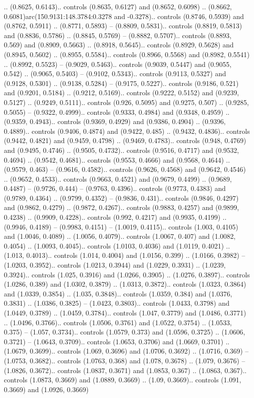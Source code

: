 .. (0.8625, 0.6143).. controls (0.8635, 0.6127) and (0.8652, 0.6098) .. (0.8662, 0.6081)arc(150.9131:148.3784:0.3278 and -0.3278).. controls (0.8746, 0.5939) and (0.8762, 0.5911) .. (0.8771, 0.5893) -- (0.8809, 0.5831).. controls (0.8819, 0.5813) and (0.8836, 0.5786) .. (0.8845, 0.5769) -- (0.8882, 0.5707).. controls (0.8893, 0.569) and (0.8909, 0.5663) .. (0.8918, 0.5645).. controls (0.8929, 0.5628) and (0.8945, 0.5602) .. (0.8955, 0.5584).. controls (0.8966, 0.5568) and (0.8982, 0.5541) .. (0.8992, 0.5523) -- (0.9029, 0.5463).. controls (0.9039, 0.5447) and (0.9055, 0.542) .. (0.9065, 0.5403) -- (0.9102, 0.5343).. controls (0.9113, 0.5327) and (0.9128, 0.5301) .. (0.9138, 0.5284) -- (0.9175, 0.5227).. controls (0.9186, 0.521) and (0.9201, 0.5184) .. (0.9212, 0.5169).. controls (0.9222, 0.5152) and (0.9239, 0.5127) .. (0.9249, 0.5111).. controls (0.926, 0.5095) and (0.9275, 0.507) .. (0.9285, 0.5055) -- (0.9322, 0.4999).. controls (0.9333, 0.4984) and (0.9348, 0.4959) .. (0.9359, 0.4943).. controls (0.9369, 0.4929) and (0.9386, 0.4904) .. (0.9396, 0.4889).. controls (0.9406, 0.4874) and (0.9422, 0.485) .. (0.9432, 0.4836).. controls (0.9442, 0.4821) and (0.9459, 0.4798) .. (0.9469, 0.4783).. controls (0.948, 0.4769) and (0.9495, 0.4746) .. (0.9505, 0.4732).. controls (0.9516, 0.4717) and (0.9532, 0.4694) .. (0.9542, 0.4681).. controls (0.9553, 0.4666) and (0.9568, 0.4644) .. (0.9579, 0.463) -- (0.9616, 0.4582).. controls (0.9626, 0.4568) and (0.9642, 0.4546) .. (0.9652, 0.4533).. controls (0.9663, 0.4521) and (0.9679, 0.4499) .. (0.9689, 0.4487) -- (0.9726, 0.444) -- (0.9763, 0.4396).. controls (0.9773, 0.4383) and (0.9789, 0.4364) .. (0.9799, 0.4352) -- (0.9836, 0.431).. controls (0.9846, 0.4297) and (0.9862, 0.4279) .. (0.9872, 0.4267).. controls (0.9883, 0.4257) and (0.9899, 0.4238) .. (0.9909, 0.4228).. controls (0.992, 0.4217) and (0.9935, 0.4199) .. (0.9946, 0.4189) -- (0.9983, 0.4151) -- (1.0019, 0.4115).. controls (1.003, 0.4105) and (1.0046, 0.4089) .. (1.0056, 0.4079).. controls (1.0067, 0.407) and (1.0082, 0.4054) .. (1.0093, 0.4045).. controls (1.0103, 0.4036) and (1.0119, 0.4021) .. (1.013, 0.4013).. controls (1.014, 0.4004) and (1.0156, 0.399) .. (1.0166, 0.3982) -- (1.0203, 0.3952).. controls (1.0213, 0.3944) and (1.0229, 0.3931) .. (1.0239, 0.3924).. controls (1.025, 0.3916) and (1.0266, 0.3905) .. (1.0276, 0.3897).. controls (1.0286, 0.389) and (1.0302, 0.3879) .. (1.0313, 0.3872).. controls (1.0323, 0.3864) and (1.0339, 0.3854) .. (1.035, 0.3848).. controls (1.0359, 0.384) and (1.0376, 0.3831) .. (1.0386, 0.3825) -- (1.0423, 0.3803).. controls (1.0433, 0.3798) and (1.0449, 0.3789) .. (1.0459, 0.3784).. controls (1.047, 0.3779) and (1.0486, 0.3771) .. (1.0496, 0.3766).. controls (1.0506, 0.3761) and (1.0522, 0.3754) .. (1.0533, 0.375) -- (1.057, 0.3734).. controls (1.0579, 0.373) and (1.0596, 0.3725) .. (1.0606, 0.3721) -- (1.0643, 0.3709).. controls (1.0653, 0.3706) and (1.0669, 0.3701) .. (1.0679, 0.3699).. controls (1.069, 0.3696) and (1.0706, 0.3692) .. (1.0716, 0.369) -- (1.0753, 0.3682).. controls (1.0763, 0.368) and (1.078, 0.3678) .. (1.079, 0.3676) -- (1.0826, 0.3672).. controls (1.0837, 0.3671) and (1.0853, 0.367) .. (1.0863, 0.367).. controls (1.0873, 0.3669) and (1.0889, 0.3669) .. (1.09, 0.3669).. controls (1.091, 0.3669) and (1.0926, 0.3669) 